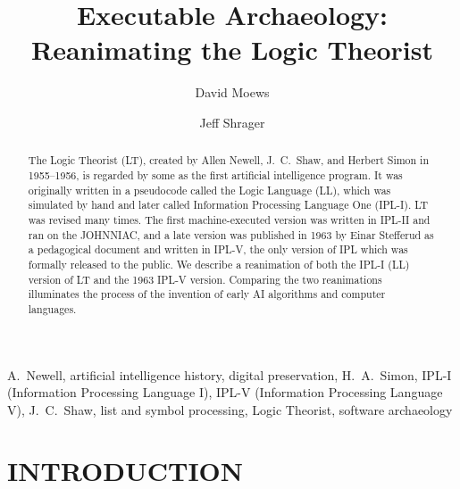 \documentclass{IEEEcsmag}
\begin{document}

\title{Executable Archaeology: Reanimating the Logic Theorist}

\author{David Moews}

\author{Jeff Shrager}



\begin{abstract}

The Logic Theorist (LT), created by Allen Newell, J.~C.~Shaw, and
Herbert Simon in 1955--1956, is regarded by some as the first
artificial intelligence program.  It was originally written in a
pseudocode called the Logic Language (LL), which was simulated by hand and later called Information Processing Language One (IPL-I). LT
was revised many times. The first machine-executed version was
written in IPL-II and ran on the JOHNNIAC, and a late version 
was published in 1963 by Einar Stefferud as a pedagogical document and written in IPL-V, the only version of IPL which was formally released to the public.
We describe a reanimation of both the IPL-I (LL) version of LT and the 1963 IPL-V version. Comparing the 
two reanimations illuminates the process of the invention of early AI algorithms and computer languages.

\end{abstract}

\maketitle

\begin{IEEEkeywords}
A.~Newell, 
artificial intelligence history,
digital preservation,
H.~A.~Simon, 
IPL-I (Information Processing Language I), 
IPL-V (Information Processing Language V), 
J.~C.~Shaw, 
list and symbol processing, 
Logic Theorist, 
software archaeology
\end{IEEEkeywords}

\section{INTRODUCTION}
\label{sec:intro}
\end{document}
